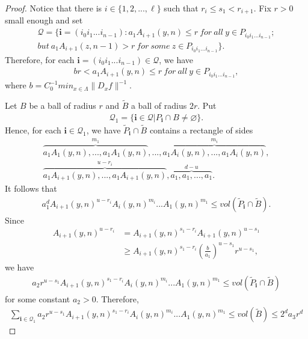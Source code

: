 \documentclass[11pt,a4paper]{amsart}
\theoremstyle{plain}
\theoremstyle{remark}
\begin{document}
\begin{proof}
		Notice that there is $i\in \{1,2,...,\ell\}$ such that $r_{i}\leq s_{1}<r_{i+1}$. Fix $r>0$ small enough and set
		\begin{align*}
			\mathcal{Q}=\{\mathbf{i}=(i_{0}i_{1}...i_{n-1}):a_{1}A_{i+1}(y,n)\leq r\ for\ all\ y \in P_{i_{0}i_{1}...i_{n-1}};\\
			but~a_{1}A_{i+1}(z,n-1)>r~for~some~z \in P_{i_{0}i_{1}...i_{n-1}}\}.
		\end{align*}
		Therefore, for each $\mathbf{i}=(i_{0}i_{1}...i_{n-1})\in \mathcal{Q}$, we have
		\begin{align*}
			br<a_{1}A_{i+1}(y,n)\leq r ~for ~all~y\in P_{i_{0}i_{1}...i_{n-1}},
		\end{align*}
		where $b=C_{0}^{-1}min_{x\in \Lambda}\|D_{x}f\|^{-1}$.
		
		Let $B$ be a ball of radius $r$ and $\tilde{B}$ a ball of radius $2r$. Put
		\begin{align*}
			\mathcal{Q}_{1}=\{\mathbf{i}\in \mathcal{Q}|P_{\mathbf{i}}\cap B\neq \varnothing\}.
		\end{align*}
		Hence, for each $\mathbf{i}\in\mathcal{Q}_{1}$, we have $\tilde{P}_{\mathbf{i}}\cap \tilde{B}$ contains a rectangle of sides
		\begin{align*}
			\overbrace{a_{1}A_{1}(y,n),...,a_{1}A_{1}(y,n)}^{m_{1}},...,\overbrace{a_{1}A_{i}(y,n),...,a_{1}A_{i}(y,n)}^{m_{i}},\\
			\overbrace{a_{1}A_{i+1}(y,n),...,a_{1}A_{i+1}(y,n)}^{u-r_{i}},\overbrace{a_{1},a_{1},...,a_{1}}^{d-u}.
		\end{align*}
		It follows that
		\begin{align*}
			a_{1}^{d}A_{i+1}(y,n)^{u-r_{i}}A_{i}(y,n)^{m_{i}}...A_{1}(y,n)^{m_{1}}\leq vol (\tilde{P}_{\mathbf{i}}\cap \tilde{B}).
		\end{align*}
		Since
		\begin{align*}
			A_{i+1}(y,n)^{u-r_{i}}&=A_{i+1}(y,n)^{s_{1}-r_{i}}A_{i+1}(y,n)^{u-s_{1}}\\
			&\geq A_{i+1}(y,n)^{s_{1}-r_{i}}(\frac{b}{a_{1}})^{u-s_{1}}r^{u-s_{1}},
		\end{align*}
		we have
		\begin{align*}
			a_{2}r^{u-s_{1}}A_{i+1}(y,n)^{s_{1}-r_{i}}A_{i}(y,n)^{m_{i}}...A_{1}(y,n)^{m_{1}}\leq vol (\tilde{P}_{\mathbf{i}}\cap \tilde{B})
		\end{align*}
		for some constant $a_{2}>0$. Therefore,
		\begin{align*}
			\sum_{\mathbf{i}\in\mathcal{Q}_{1}}a_{2}r^{u-s_{1}}A_{i+1}(y,n)^{s_{1}-r_{i}}A_{i}(y,n)^{m_{i}}...A_{1}(y,n)^{m_{1}}\leq vol (\tilde{B})\leq 2^{d}a_{3}r^{d}

\end{align*}
\end{proof}
\end{document}
